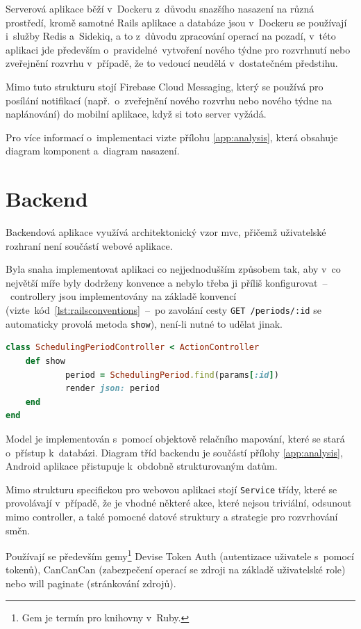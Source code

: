 \documentclass[a4paper,11pt,openany,twoside]{book}
\begin{document}
Serverová aplikace běží v~Dockeru z~důvodu snazšího nasazení na různá prostředí, kromě samotné Rails aplikace a databáze jsou v~Dockeru se používají i~služby Redis a~Sidekiq, a to z~důvodu zpracování operací na pozadí, v~této aplikaci jde především o~pravidelné~vytvoření nového týdne pro rozvrhnutí nebo zveřejnění rozvrhu v~případě, že to vedoucí neudělá v~dostatečném předstihu.

Mimo tuto strukturu stojí Firebase Cloud Messaging, který se používá pro posílání notifikací (např.~o~zveřejnění nového rozvrhu nebo nového týdne na naplánování) do mobilní aplikace, když si toto server vyžádá.

Pro více informací o~implementaci vizte přílohu \ref{app:analysis}, která obsahuje diagram komponent a~diagram nasazení.


\section{Backend}

Backendová aplikace využívá architektonický vzor \acs{mvc}, přičemž uživatelské rozhraní není součástí webové aplikace.

Byla snaha implementovat aplikaci co nejjednodušším způsobem tak, aby v~co největší míře byly dodrženy konvence a nebylo třeba ji příliš konfigurovat~–~controllery jsou implementovány na základě konvencí (vizte~kód~\ref{lst:railsconventions}~–~po zavolání cesty \texttt{GET /periods/:id} se automaticky provolá metoda \texttt{show}), není-li nutné to udělat jinak.

\begin{lstlisting}[language=Ruby,caption={Konvenční ActionController}, label={lst:railsconventions}]
class SchedulingPeriodController < ActionController
	def show
			period = SchedulingPeriod.find(params[:id])
			render json: period
	end
end
\end{lstlisting}

Model je implementován s~pomocí objektově relačního mapování, které se stará o~přístup k~databázi. Diagram tříd backendu je součástí přílohy \ref{app:analysis}, Android aplikace přistupuje k~obdobně strukturovaným datům.

Mimo strukturu specifickou pro webovou aplikaci stojí \texttt{Service} třídy, které se provolávají v~případě, že je vhodné některé akce, které nejsou triviální, odsunout mimo controller, a také pomocné datové struktury a strategie pro rozvrhování směn.

Používají se především gemy\footnote{Gem je termín pro knihovny v~Ruby.} Devise Token Auth (autentizace uživatele s~pomocí tokenů), CanCanCan (zabezpečení operací se zdroji na základě uživatelské role) nebo will paginate (stránkování zdrojů).
\end{document}
